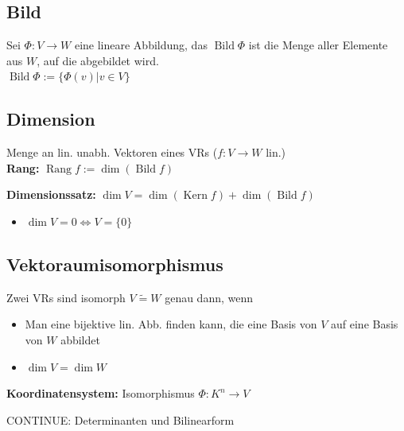 \documentclass[german, fourcolumn, 8pt]{latex4ei/latex4ei_sheet}
\newcommand{\equival}[0]{\ensuremath{\Longleftrightarrow}}
\DeclareMathOperator{\Rang}{Rang}
\DeclareMathOperator{\Kern}{Kern}
\DeclareMathOperator{\Bild}{Bild}
\begin{document}
\begin{sectionbox}
    \subsection{Bild}
    Sei $\Phi : V \rightarrow W$ eine lineare Abbildung, das $\Bild \Phi$ ist die Menge aller Elemente aus $W$, auf die abgebildet wird.\\
    $\Bild \Phi := \{\Phi(v) | v \in V\}$
\end{sectionbox}

\begin{sectionbox}
    \subsection{Dimension}
    Menge an lin. unabh. Vektoren eines VRs ($f: V\rightarrow W$ lin.)\\
    \textbf{Rang:} $\Rang f := \dim(\Bild f)$

    \textbf{Dimensionssatz:} $\dim V = \dim(\Kern f) + \dim(\Bild f)$
    \begin{itemize}
        \item $\dim V = 0 \equival V=\{0\}$
    \end{itemize}
\end{sectionbox}

\begin{sectionbox}
    \subsection{Vektoraumisomorphismus}
    Zwei VRs sind isomorph $V \tilde{=} W$ genau dann, wenn
    \begin{itemize}
        \item Man eine bijektive lin. Abb. finden kann, die eine Basis von $V$ auf eine Basis von $W$ abbildet
        \item $\dim V = \dim W$
    \end{itemize}
    \textbf{Koordinatensystem:} Isomorphismus $\Phi:K^n \rightarrow V$
\end{sectionbox}

CONTINUE: Determinanten und Bilinearform
\end{document}
